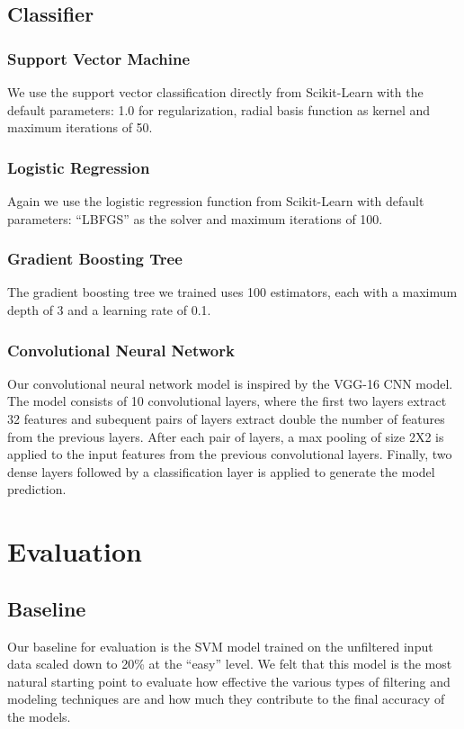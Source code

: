 \documentclass[
	a4paper, %
	10pt, %
	unnumberedsections, %
	twoside, %
]{t0004}
\begin{document}
\subsection{Classifier}

\subsubsection{Support Vector Machine} We use the support vector classification directly from Scikit-Learn with the default parameters: 1.0 for regularization, radial basis function as kernel and maximum iterations of 50. 

\subsubsection{Logistic Regression} Again we use the logistic regression function from Scikit-Learn with default parameters: ``LBFGS'' as the solver and maximum iterations of 100.

\subsubsection{Gradient Boosting Tree} The gradient boosting tree we trained uses 100 estimators, each with a maximum depth of 3 and a learning rate of 0.1.

\subsubsection{Convolutional Neural Network}  Our convolutional neural network model is inspired by the VGG-16 CNN model. The model consists of 10 convolutional layers, where the first two layers extract 32 features and subequent pairs of layers extract double the number of features from the previous layers. After each pair of layers, a max pooling of size 2X2 is applied to the input features from the previous convolutional layers. Finally, two dense layers followed by a classification layer is applied to generate the model prediction. 

\section{Evaluation}

\subsection{Baseline}

Our baseline for evaluation is the SVM model trained on the unfiltered input data scaled down to 20\% at the ``easy'' level. We felt that this model is the most natural starting point to evaluate how effective the various types of filtering and modeling techniques are and how much they contribute to the final accuracy of the models.
\end{document}
